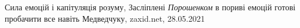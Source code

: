  
 
 
 
 
Сила емоцій і капітуляція розуму, Засліплені \emph{Порошенком} в пориві емоцій готові
пробачити все навіть Медведчуку, zaxid.net, 28.05.2021

